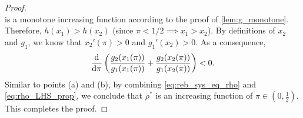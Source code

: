 \begin{proof}
\begin{equation*}
        \end{equation*}
        is a monotone increasing function according to the proof of \cref{lem:g_monotone}. Therefore, $h(x_1) > h(x_2)$ (since $\pi < 1/2 \implies x_1 > x_2$). By definitions of $x_2$ and $g_1$, we know that $x_2'(\pi) > 0$ and $g_1'(x_2) > 0$. As a consequence,
	\begin{equation*}
		\frac{\textup{d}}{\textup{d} \pi} \left( \frac{g_2 (x_1(\pi))}{g_1 (x_1(\pi))} + \frac{g_2 (x_2(\pi))}{g_1 (x_2(\pi))} \right) < 0.
	\end{equation*}
	Similar to points (a) and (b), by combining \cref{eq:reb_sys_eq_rho} and \eqref{eq:rho_LHS_prop}, we conclude that $\rho^*$ is an increasing function of $\pi \in (0, \frac12)$. This completes the proof.
\end{proof}




